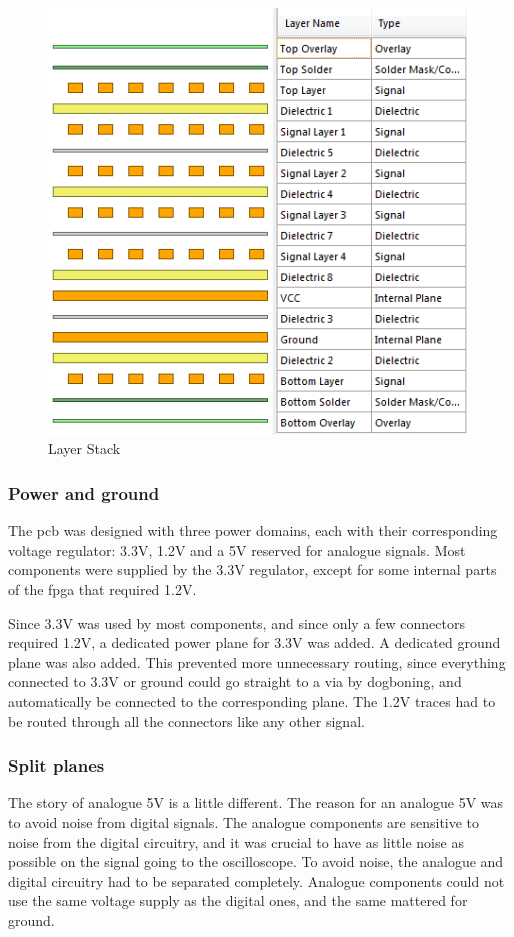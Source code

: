 \begin{figure}[h!]
\centering
\includegraphics[scale = 0.8]{images/Layers.png}
\caption{Layer Stack}
\label{fig:Layers}
\end{figure}

\subsubsection{Power and ground}
\label{Power}
The \gls{pcb} was designed with three power domains, each with their corresponding voltage regulator: 3.3V, 1.2V and a 5V reserved for analogue signals.
Most components were supplied by the 3.3V regulator, except for some internal parts of the \gls{fpga} that required 1.2V.

Since 3.3V was used by most components, and since only a few connectors required 1.2V, a dedicated power plane for 3.3V was added.
A dedicated ground plane was also added.
This prevented more unnecessary routing, since everything connected to 3.3V or ground could go straight to a via by dogboning, and automatically be connected to the corresponding plane. 
The 1.2V traces had to be routed through all the connectors like any other signal. 

\subsubsection{Split planes}
The story of analogue 5V is a little different. 
The reason for an analogue 5V was to avoid noise from digital signals. 
The analogue components are sensitive to noise from the digital circuitry, and it was crucial to have as little noise as possible on the signal going to the oscilloscope. 
To avoid noise, the analogue and digital circuitry had to be separated completely. 
Analogue components could not use the same voltage supply as the digital ones, and the same mattered for ground.

